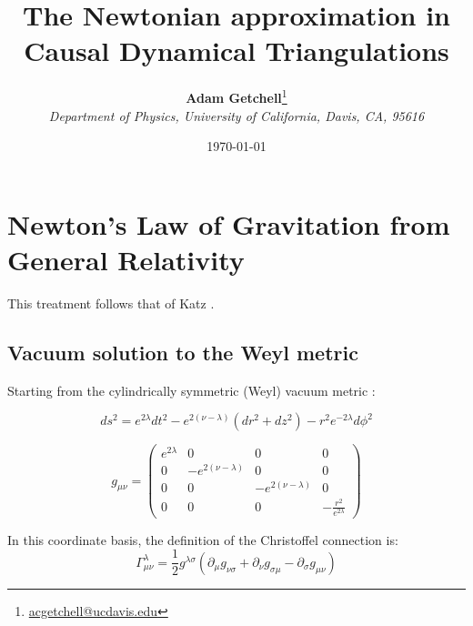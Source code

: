 \documentclass{article}
\title{The Newtonian approximation in Causal Dynamical Triangulations}
\author{\textbf{Adam Getchell}\footnote{\href{mailto:acgetchell@ucdavis.edu}{acgetchell@ucdavis.edu}}\\\textit{Department of Physics, University of California, Davis, CA, 95616}}
\date{\today}
\begin{document}
\maketitle
\tableofcontents

\section{Newton's Law of Gravitation from General Relativity}

This treatment follows that of Katz \cite{katz1967derivation}.

\subsection{Vacuum solution to the Weyl metric}

Starting from the cylindrically symmetric (Weyl) vacuum metric \cite{synge_relativity}:

\begin{equation}
	ds^{2}=e^{2\lambda}dt^{2}-e^{2\left(\nu-\lambda\right)}\left(dr^{2}+dz^{2}\right)-r^{2}e^{-2\lambda}d\phi^{2}
	\label{eq:weyl-vacuum-metric}
\end{equation}

\begin{equation}
g_{\mu\nu}=\left(\begin{array}{cccc}
e^{2\lambda} & 0 & 0 & 0\\
0 & -e^{2\left(\nu-\lambda\right)} & 0 & 0\\
0 & 0 & -e^{2\left(\nu-\lambda\right)} & 0\\
0 & 0 & 0 & -\frac{r^{2}}{e^{2\lambda}}
\end{array}\right)\label{eq:general-axisymmetric-static-matrix-metric}
\end{equation}

In this coordinate basis, the definition of the Christoffel connection is: \cite{carroll2003spacetime} 
\begin{equation}
\Gamma_{\mu\nu}^{\lambda}=\frac{1}{2}g^{\lambda\sigma}\left(\partial_{\mu}g_{\nu\sigma}+\partial_{\nu}g_{\sigma\mu}-\partial_{\sigma}g_{\mu\nu}\right)
\end{equation}
\end{document}
